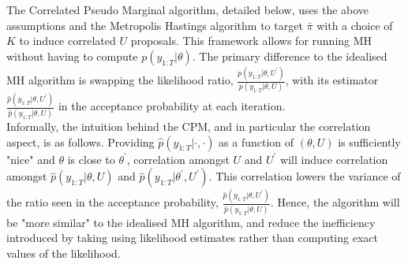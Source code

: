\documentclass{article}
\begin{document}
The Correlated Pseudo Marginal algorithm, detailed below, uses the above assumptions and the Metropolis Hastings algorithm to target $\bar{\pi}$ with a choice of $K$ to induce correlated $U$ proposals. This framework allows for running MH without having to compute $p(y_{1:T}| \theta)$. The primary difference to the idealised MH algorithm is swapping the likelihood ratio, $\frac{ p(y_{1:T}| \theta, U^\prime)}{ p(y_{1:T}| \theta, U)}$, with its estimator $\frac{ \hat{p}(y_{1:T}| \theta, U^\prime)}{ \hat{p}(y_{1:T}| \theta, U)}$ in the acceptance probability at each iteration. \\

Informally, the intuition behind the CPM, and in particular the correlation aspect, is as follows. Providing $\hat{p}(y_{1:T}| \cdot, \cdot)$ as a function of $(\theta, U)$ is sufficiently "nice" and $\theta$ is close to $\theta^\prime$, correlation amongst $U$ and $U^\prime$ will induce correlation amongst $\hat{p}(y_{1:T}| \theta, U)$ and $\hat{p}(y_{1:T}| \theta^\prime, U^\prime)$. This correlation lowers the variance of the ratio seen in the acceptance probability, $\frac{ \hat{p}(y_{1:T}| \theta, U^\prime)}{ \hat{p}(y_{1:T}| \theta, U)}$. Hence, the algorithm will be "more similar" to the idealised MH algorithm, and reduce the inefficiency introduced by taking using likelihood estimates rather than computing exact values of the likelihood.
\end{document}
